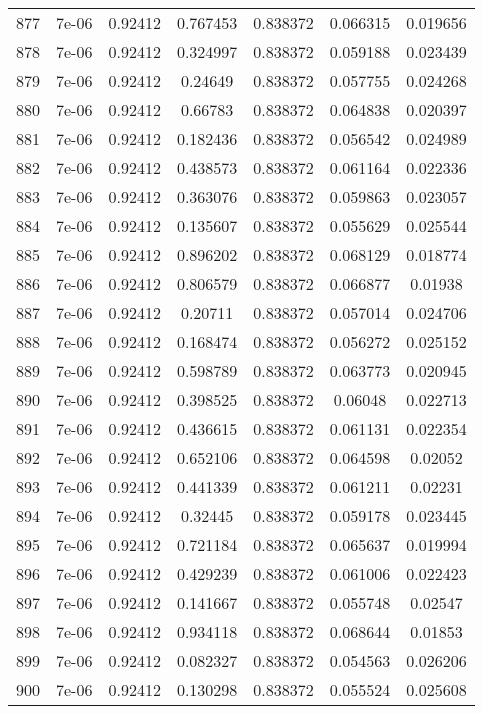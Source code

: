 \begin{table}
\begin{tabular*}{\linewidth}{c|c|c|c|c|c|c}
877 & 7e-06 & 0.92412 & 0.767453 & 0.838372 & 0.066315 & 0.019656\\
878 & 7e-06 & 0.92412 & 0.324997 & 0.838372 & 0.059188 & 0.023439\\
879 & 7e-06 & 0.92412 & 0.24649 & 0.838372 & 0.057755 & 0.024268\\
880 & 7e-06 & 0.92412 & 0.66783 & 0.838372 & 0.064838 & 0.020397\\
881 & 7e-06 & 0.92412 & 0.182436 & 0.838372 & 0.056542 & 0.024989\\
882 & 7e-06 & 0.92412 & 0.438573 & 0.838372 & 0.061164 & 0.022336\\
883 & 7e-06 & 0.92412 & 0.363076 & 0.838372 & 0.059863 & 0.023057\\
884 & 7e-06 & 0.92412 & 0.135607 & 0.838372 & 0.055629 & 0.025544\\
885 & 7e-06 & 0.92412 & 0.896202 & 0.838372 & 0.068129 & 0.018774\\
886 & 7e-06 & 0.92412 & 0.806579 & 0.838372 & 0.066877 & 0.01938\\
887 & 7e-06 & 0.92412 & 0.20711 & 0.838372 & 0.057014 & 0.024706\\
888 & 7e-06 & 0.92412 & 0.168474 & 0.838372 & 0.056272 & 0.025152\\
889 & 7e-06 & 0.92412 & 0.598789 & 0.838372 & 0.063773 & 0.020945\\
890 & 7e-06 & 0.92412 & 0.398525 & 0.838372 & 0.06048 & 0.022713\\
891 & 7e-06 & 0.92412 & 0.436615 & 0.838372 & 0.061131 & 0.022354\\
892 & 7e-06 & 0.92412 & 0.652106 & 0.838372 & 0.064598 & 0.02052\\
893 & 7e-06 & 0.92412 & 0.441339 & 0.838372 & 0.061211 & 0.02231\\
894 & 7e-06 & 0.92412 & 0.32445 & 0.838372 & 0.059178 & 0.023445\\
895 & 7e-06 & 0.92412 & 0.721184 & 0.838372 & 0.065637 & 0.019994\\
896 & 7e-06 & 0.92412 & 0.429239 & 0.838372 & 0.061006 & 0.022423\\
897 & 7e-06 & 0.92412 & 0.141667 & 0.838372 & 0.055748 & 0.02547\\
898 & 7e-06 & 0.92412 & 0.934118 & 0.838372 & 0.068644 & 0.01853\\
899 & 7e-06 & 0.92412 & 0.082327 & 0.838372 & 0.054563 & 0.026206\\
900 & 7e-06 & 0.92412 & 0.130298 & 0.838372 & 0.055524 & 0.025608\\
\end{tabular*}
\end{table}
